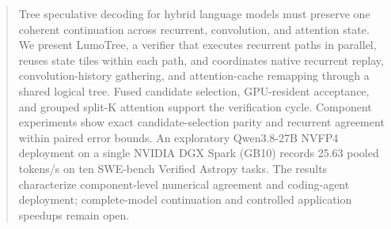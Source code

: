 \begin{abstract}
Tree speculative decoding for hybrid language models must preserve one coherent continuation across recurrent, convolution, and attention state. We present LumoTree, a verifier that executes recurrent paths in parallel, reuses state tiles within each path, and coordinates native recurrent replay, convolution-history gathering, and attention-cache remapping through a shared logical tree. Fused candidate selection, GPU-resident acceptance, and grouped split-K attention support the verification cycle. Component experiments show exact candidate-selection parity and recurrent agreement within paired error bounds. An exploratory Qwen3.8-27B NVFP4 deployment on a single NVIDIA DGX Spark (GB10) records 25.63 pooled tokens/s on ten SWE-bench Verified Astropy tasks. The results characterize component-level numerical agreement and coding-agent deployment; complete-model continuation and controlled application speedups remain open.
\end{abstract}
